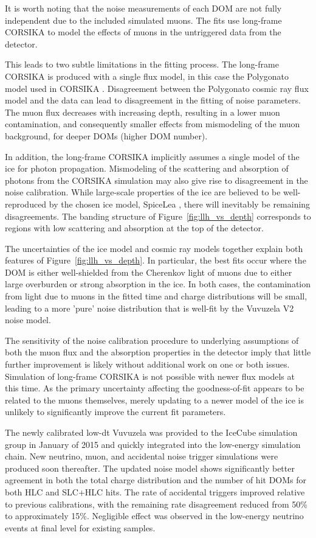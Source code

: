 It is worth noting that the noise measurements of each DOM are not fully independent due to the included simulated muons.
The fits use long-frame CORSIKA to model the effects of muons in the untriggered data from the detector.

This leads to two subtle limitations in the fitting process.
The long-frame CORSIKA is produced with a single flux model, in this case the Polygonato model used in CORSIKA \cite{Hoerandel-Polygonato}.
Disagreement between the Polygonato cosmic ray flux model and the data can lead to disagreement in the fitting of noise parameters.
The muon flux decreases with increasing depth, resulting in a lower muon contamination, and consequently smaller effects from mismodeling of the muon background, for deeper DOMs (higher DOM number). 

In addition, the long-frame CORSIKA implicitly assumes a single model of the ice for photon propagation.
Mismodeling of the scattering and absorption of photons from the CORSIKA simulation may also give rise to disagreement in the noise calibration.
While large-scale properties of the ice are believed to be well-reproduced by the chosen ice model, SpiceLea \cite{IceCube-SpiceLea}, there will inevitably be remaining disagreements.
The banding structure of Figure~\ref{fig:llh_vs_depth} corresponds to regions with low scattering and absorption at the top of the detector.

The uncertainties of the ice model and cosmic ray models together explain both features of Figure~\ref{fig:llh_vs_depth}.
In particular, the best fits occur where the DOM is either well-shielded from the Cherenkov light of muons due to either large overburden or strong absorption in the ice.
In both cases, the contamination from light due to muons in the fitted time and charge distributions will be small, leading to a more 'pure' noise distribution that is well-fit by the Vuvuzela V2 noise model.

The sensitivity of the noise calibration procedure to underlying assumptions of both the muon flux and the absorption properties in the detector imply that little further improvement is likely without additional work on one or both issues.
Simulation of long-frame CORSIKA is not possible with newer flux models at this time.
As the primary uncertainty affecting the goodness-of-fit appears to be related to the muons themselves, merely updating to a newer model of the ice is  unlikely to significantly improve the current fit parameters.

The newly calibrated low-dt Vuvuzela was provided to the IceCube simulation group in January of 2015 and quickly integrated into the low-energy simulation chain.
New neutrino, muon, and accidental noise trigger simulations were produced soon thereafter.
The updated noise model shows significantly better agreement in both the total charge distribution and the number of hit DOMs for both HLC and SLC+HLC hits.
The rate of accidental triggers improved relative to previous calibrations, with the remaining rate disagreement reduced from 50\% to approximately 15\%.
Negligible effect was observed in the low-energy neutrino events at final level for existing samples.

